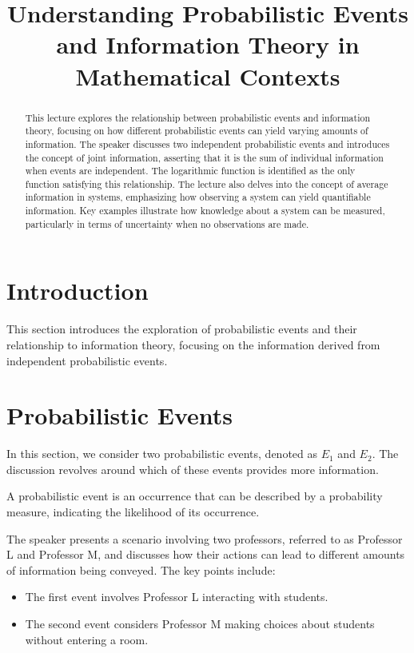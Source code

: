 \documentclass[12pt,a4paper]{article}
\title{Understanding Probabilistic Events and Information Theory in Mathematical Contexts}
\newenvironment{defbox}[1][]{%
  \begin{tcolorbox}[enhanced, breakable, colback=defcolor, colframe=green!50!black, title=#1, fonttitle=\bfseries, arc=3pt, boxrule=0.5pt]
}{\end{tcolorbox}}
\begin{document}
\maketitle
\begin{abstract}
This lecture explores the relationship between probabilistic events and information theory, focusing on how different probabilistic events can yield varying amounts of information. The speaker discusses two independent probabilistic events and introduces the concept of joint information, asserting that it is the sum of individual information when events are independent. The logarithmic function is identified as the only function satisfying this relationship. The lecture also delves into the concept of average information in systems, emphasizing how observing a system can yield quantifiable information. Key examples illustrate how knowledge about a system can be measured, particularly in terms of uncertainty when no observations are made.
\end{abstract}

\section{Introduction}
This section introduces the exploration of probabilistic events and their relationship to information theory, focusing on the information derived from independent probabilistic events.

\section{Probabilistic Events}
In this section, we consider two probabilistic events, denoted as \(E_1\) and \(E_2\). The discussion revolves around which of these events provides more information.

\begin{defbox}[Probabilistic Events]
A probabilistic event is an occurrence that can be described by a probability measure, indicating the likelihood of its occurrence.
\end{defbox}

The speaker presents a scenario involving two professors, referred to as Professor L and Professor M, and discusses how their actions can lead to different amounts of information being conveyed. The key points include:

\begin{itemize}
    \item The first event involves Professor L interacting with students.
    \item The second event considers Professor M making choices about students without entering a room.
\end{itemize}
\end{document}
